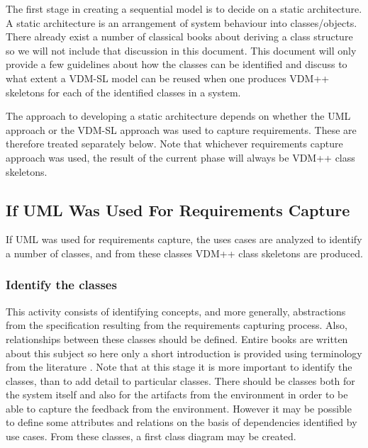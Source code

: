 \documentclass{overturerepchap}
\begin{document}
The first stage in creating a sequential model is to decide on a
static architecture. A static architecture is an arrangement of system
behaviour into classes/objects. There already exist a number of
classical books about deriving a class structure
\cite{Rumbaugh&91,Meyer88, Douglass99} so we will not include that
discussion in this document. This document will only provide a few
guidelines about how the classes can be identified and discuss to what
extent a VDM-SL model can be reused when one produces VDM++ skeletons
for each of the identified classes in a system.

The approach to developing a static architecture depends on whether
the UML approach or the VDM-SL approach was used to capture
requirements. These are therefore treated separately below. Note
that whichever requirements capture approach was used, the result of
the current phase will always be VDM++ class skeletons.

\subsection{If UML Was Used For Requirements Capture}\label{subsec:UMLreq}

If UML was used for requirements capture, the uses cases are analyzed
to identify a number of classes, and from these classes VDM++ class
skeletons are produced.

\subsubsection{Identify the classes}

This activity consists of identifying concepts, and more generally,
abstractions from the specification resulting from the requirements
capturing process. Also, relationships between these classes should be
defined. Entire books are written about this subject so here only a
short introduction is provided using terminology from the literature
\cite{Kruchten00}. Note that at this stage it is more important to identify the
classes, than to add detail to particular classes. There should be
classes both for the system itself and also for the artifacts from the
environment in order to be able to capture the feedback from the
environment. However it may be possible to define some attributes and
relations on the basis of dependencies identified by use cases. From
these classes, a first class diagram may be created.
\end{document}
